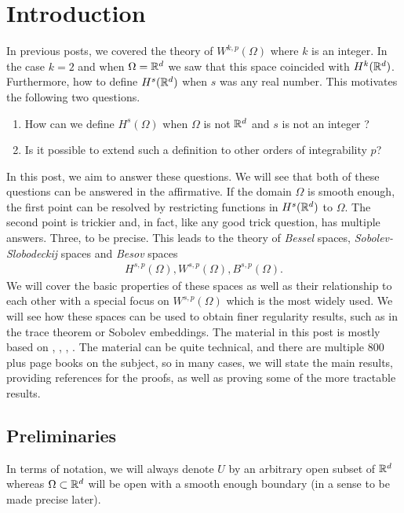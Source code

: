 \documentclass[
    a4paper,
    DIV=14,
    abstract=true,
    numbers=noenddot
]{scrartcl}
\begin{document}
\section{Introduction}
In previous posts, we covered the theory of  $W^{k,p}(\Omega )$ where $k$ is an integer. In the case $k=2$ and when $\Omega =\mathbb{R}^d$ we saw that this space coincided with $H^k(\mathbb{R}^d)$. Furthermore,  how to define $H^s(\mathbb{R}^d)$ when $s$ was any real number. This motivates the following two questions.
\begin{enumerate}
    \item How can we define $H^s(\Omega )$  when $\Omega $ is not $\mathbb{R}^d$ and $s$ is not an integer ?
    \item Is it possible to extend such a definition to other orders of integrability $p$?
\end{enumerate}
In this post, we aim to answer these questions. We will see that both of these questions can be answered in the affirmative. If the domain $\Omega $  is smooth enough, the first point can be resolved by restricting functions in $H^s(\mathbb{R}^d)$ to $\Omega $. The second point is trickier and, in fact, like any good trick question, has multiple answers. Three, to be precise. This leads to the theory of \emph{Bessel} spaces, \emph{Sobolev-Slobodeckij} spaces and \emph{Besov} spaces
\begin{align*}
    H^{s,p}(\Omega ),W^{s,p}(\Omega ),B^{s,p}(\Omega ).
\end{align*}
We will cover the basic properties of these spaces as well as their relationship to each other with a special focus on $W^{s,p}(\Omega )$ which is the most widely used.  We will see how these spaces can be used to obtain finer regularity results, such as in the trace theorem or Sobolev embeddings. The material in this post is mostly based on \cite{leoni2023first}, \cite{agranovich2015sobolev}, \cite{di2012hitchhikers}, \cite{triebel1992theory}. The material can be quite technical, and there are multiple $800$ plus page books on the subject, so in many cases, we will state the main results, providing references for the proofs, as well as proving some of the more tractable results.
\subsection{Preliminaries}
In terms of notation, we will always denote $U$ by an arbitrary open subset of $\mathbb{R}^d$  whereas $\Omega \subset \mathbb{R}^d $ will be open with a smooth enough boundary (in a sense to be made precise later).
\end{document}

